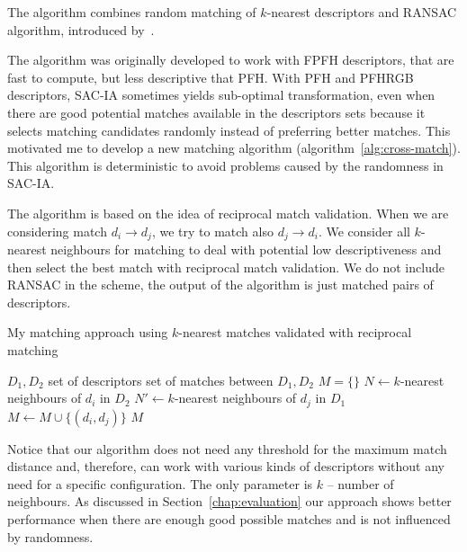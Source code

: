 The algorithm combines random matching of $k$-nearest descriptors and \gls{RANSAC} algorithm, introduced by~\citet{fischler1981ransac}.


The algorithm was originally developed to work with \gls{FPFH} descriptors, that are fast to compute, but less descriptive that \gls{PFH}. With \gls{PFH} and \gls{PFHRGB} descriptors, \gls{SAC-IA} sometimes yields sub-optimal transformation, even when there are good potential matches available in the descriptors sets because it selects matching candidates randomly instead of preferring better matches. This motivated me to develop a new matching algorithm (algorithm~\ref{alg:cross-match}). This algorithm is deterministic to avoid problems caused by the randomness in \gls{SAC-IA}.

The algorithm is based on the idea of reciprocal match validation. When we are considering match $d_i \rightarrow d_j$, we try to match also $d_j \rightarrow d_i$. We consider all $k$-nearest neighbours for matching to deal with potential low descriptiveness and then select the best match with reciprocal match validation. We do not include \gls{RANSAC} in the scheme, the output of the algorithm is just matched pairs of descriptors.

\begin{algorithm}
    \caption[Reciprocal $k$-nearest matching]{My matching approach using $k$-nearest matches validated with reciprocal matching}
    \label{alg:cross-match}
    \begin{algorithmic}[1]
        \Require $D_1, D_2$ set of descriptors
        \Ensure set of matches between $D_1, D_2$
            \State $M = \{\}$
                \State $N \gets k$-nearest neighbours of $d_i$ in $D_2$
                    \State $N' \gets k$-nearest neighbours of $d_j$ in $D_1$
                        \State $M \gets M \cup \{(d_i, d_j)\}$
                    \EndIf
                \EndFor
            \EndFor
            \State \Return $M$
        \EndFunction
    \end{algorithmic}
\end{algorithm}

Notice that our algorithm does not need any threshold for the maximum match distance and, therefore, can work with various kinds of descriptors without any need for a specific configuration. The only parameter is $k$ -- number of neighbours. As discussed in Section~\ref{chap:evaluation} our approach shows better performance when there are enough good possible matches and is not influenced by randomness.


